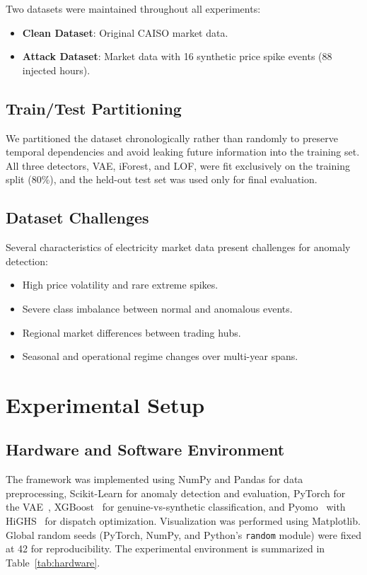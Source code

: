 \documentclass[journal]{IEEEtran}
\begin{document}
Two datasets were maintained throughout all experiments:

\begin{itemize}
    \item \textbf{Clean Dataset}: Original CAISO market data.
    \item \textbf{Attack Dataset}: Market data with 16 synthetic price spike events (88 injected hours).
\end{itemize}

\subsection{Train/Test Partitioning}
We partitioned the dataset chronologically rather than randomly to preserve temporal dependencies and avoid leaking future information into the training set. All three detectors, VAE, iForest, and LOF, were fit exclusively on the training split (80\%), and the held-out test set was used only for final evaluation.

\subsection{Dataset Challenges}
Several characteristics of electricity market data present challenges for anomaly detection:

\begin{itemize}
    \item High price volatility and rare extreme spikes.
    \item Severe class imbalance between normal and anomalous events.
    \item Regional market differences between trading hubs.
    \item Seasonal and operational regime changes over multi-year spans.
\end{itemize}

\section{Experimental Setup}

\subsection{Hardware and Software Environment}
The framework was implemented using NumPy and Pandas for data preprocessing, Scikit-Learn for anomaly detection and evaluation, PyTorch for the VAE~\cite{VAE}, XGBoost~\cite{XGBoost} for genuine-vs-synthetic classification, and Pyomo~\cite{Pyomo} with HiGHS~\cite{HiGHS} for dispatch optimization. Visualization was performed using Matplotlib. Global random seeds (PyTorch, NumPy, and Python's \texttt{random} module) were fixed at 42 for reproducibility. The experimental environment is summarized in Table~\ref{tab:hardware}.
\end{document}
